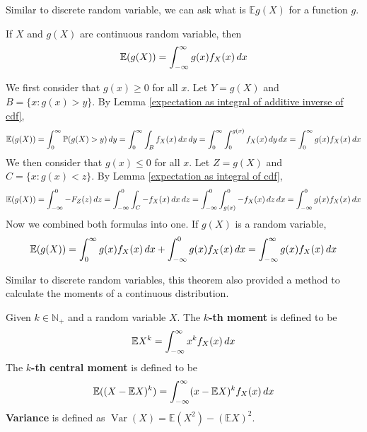 \documentclass{huhtakm-template-book}
\newcommand{\prob}{\mathbb{P}}
\newcommand{\expect}{\mathbb{E}}
\DeclareMathOperator{\Var}{Var}
\begin{document}
    Similar to discrete random variable, we can ask what is $\expect g(X)$ for a function $g$.
    \begin{thm}
        \label{expectation of function of continuous random variable}
        If $X$ and $g(X)$ are continuous random variable, then
        \begin{equation*}
            \expect(g(X))=\intinfty g(x)f_{X}(x)\,dx
        \end{equation*}
    \end{thm}

    \newpage
    \begin{proofing}
        We first consider that $g(x)\geq 0$ for all $x$. Let $Y=g(X)$ and $B=\{x:g(x)>y\}$. By Lemma \ref{expectation as integral of additive inverse of cdf},
        \begin{equation*}
            \expect(g(X))=\intlu{0}{\infty}\prob(g(X)>y)\,dy=\intlu{0}{\infty}\int_{B}f_{X}(x)\,dx\,dy=\intlu{0}{\infty}\intlu{0}{g(x)}f_{X}(x)\,dy\,dx=\intlu{0}{\infty}g(x)f_{X}(x)\,dx
        \end{equation*}
        We then consider that $g(x)\leq 0$ for all $x$. Let $Z=g(X)$ and $C=\{x:g(x)<z\}$. By Lemma \ref{expectation as integral of cdf},
        \begin{equation*}
            \expect(g(X))=\intlu{-\infty}{0}-F_{Z}(z)\,dz=\intlu{-\infty}{0}\int_{C}-f_{X}(x)\,dx\,dz=\intlu{-\infty}{0}\intlu{g(x)}{0}-f_{X}(x)\,dz\,dx=\intlu{-\infty}{0}g(x)f_{X}(x)\,dx
        \end{equation*}
        Now we combined both formulas into one. If $g(X)$ is a random variable,
        \begin{equation*}
            \expect(g(X))=\int_{0}^{\infty}g(x)f_{X}(x)\,dx+\intlu{-\infty}{0}g(x)f_{X}(x)\,dx=\intinfty g(x)f_{X}(x)\,dx
        \end{equation*}
    \end{proofing}
    Similar to discrete random variables, this theorem also provided a method to calculate the moments of a continuous distribution.
    \begin{defn}
        Given $k\in\mathbb{N}_{+}$ and a random variable $X$. The \textbf{$k$-th moment} is defined to be
        \begin{equation*}
            \expect X^{k}=\intinfty x^{k}f_{X}(x)\,dx
        \end{equation*}
        The \textbf{$k$-th central moment} is defined to be
        \begin{equation*}
            \expect((X-\expect X)^{k})=\intinfty(x-\expect X)^{k}f_{X}(x)\,dx
        \end{equation*}
        \textbf{Variance} is defined as $\Var(X)=\expect(X^{2})-(\expect X)^{2}$.
    \end{defn}
\end{document}
